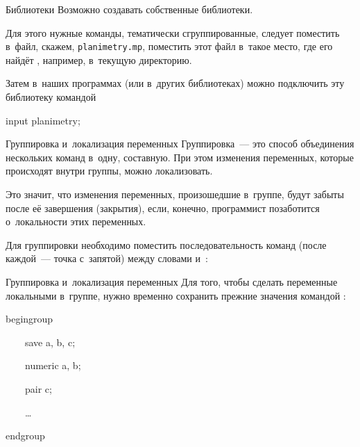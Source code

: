 
\begin{frame}{Библиотеки}
Возможно создавать собственные библиотеки.

Для этого нужные команды, тематически сгруппированные, следует поместить в~файл,
скажем, \nolinkurl{planimetry.mp}, поместить этот файл в~такое место, где
его найдёт , например, в~текущую директорию.

Затем в~наших программах (или в~других библиотеках) можно подключить эту
библиотеку командой
\begin{programlisting}
input planimetry;
\end{programlisting}
\end{frame}


\begin{frame}{Группировка и~локализация переменных}
Группировка~— это способ объединения нескольких команд в~одну, составную. При
этом изменения переменных, которые происходят внутри группы, можно
локализовать.

Это значит, что изменения переменных, произошедшие в~группе, будут забыты после
её завершения (закрытия), если, конечно, программист позаботится о~локальности
этих переменных.

Для группировки необходимо поместить последовательность команд (после каждой~—
точка с~запятой) между словами  и~:
\begin{center}
\LARGE
{}
\end{center}
\end{frame}


\begin{frame}{Группировка и~локализация переменных}
Для того, чтобы сделать переменные локальными в~группе, нужно временно
сохранить прежние значения командой :
\begin{programlisting}
begingroup\par
~~~~\alert{save a, b, c};\par
~~~~numeric a, b;\par
~~~~pair c;\par
~~~~…\par
endgroup
\end{programlisting}
\end{frame}


